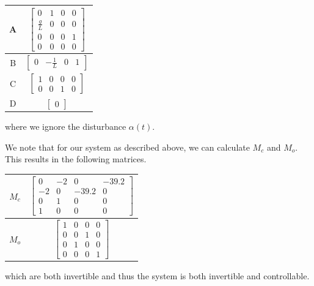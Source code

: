 \documentclass[10pt]{article}
\begin{document}
\begin{center}
    \begin{tabular}{| c | c |}
        \hline
        A & $\begin{bmatrix}
                0 & 1 & 0 & 0 \\
                \frac{g}{L} & 0 & 0 & 0 \\
                0 & 0 & 0 & 1 \\
                0 & 0 & 0 & 0
             \end{bmatrix}$ \\
        \hline
        B & $\begin{bmatrix}
                0 & -\frac{1}{L} & 0 & 1
             \end{bmatrix}$ \\
        \hline
        C & $\begin{bmatrix}
                1 & 0 & 0 & 0 \\
                0 & 0 & 1 & 0
             \end{bmatrix}$ \\
        \hline
        D & $\begin{bmatrix}
                0
             \end{bmatrix}$ \\
        \hline
    \end{tabular}
\end{center}

where we ignore the disturbance $\alpha(t)$.

We note that for our system as described above, we can calculate $M_c$ and $M_o$. This results in the following matrices.

\begin{center}
    \begin{tabular}{| c | c |}
        \hline
        $M_c$ & $\begin{bmatrix}
                0 & -2 & 0 & -39.2 \\
                -2 & 0 & -39.2 & 0 \\
                0 & 1 & 0 & 0 \\
                1 & 0 & 0 & 0
             \end{bmatrix}$ \\
        \hline
        $M_o$ & $\begin{bmatrix}
                1 & 0 & 0 & 0 \\
                0 & 0 & 1 & 0 \\
                0 & 1 & 0 & 0 \\
                0 & 0 & 0 & 1
             \end{bmatrix}$ \\
        \hline
    \end{tabular}
\end{center}

which are both invertible and thus the system is both invertible and controllable.
\end{document}
